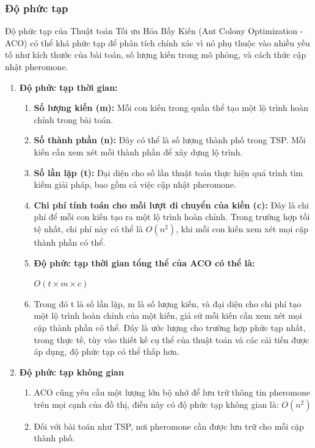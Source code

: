\documentclass[14pt]{article}
\begin{document}
	\subsubsection{Độ phức tạp}
	Độ phức tạp của Thuật toán Tối ưu Hóa Bầy Kiến (Ant Colony Optimization - ACO) có thể khá phức tạp để phân tích chính xác vì nó phụ thuộc vào nhiều yếu tố như kích thước của bài toán, số lượng kiến trong mô phỏng, và cách thức cập nhật pheromone.
	\begin{enumerate}
		\item\textbf{Độ phức tạp thời gian:}
		\begin{enumerate}
			\item\textbf{Số lượng kiến (m):} Mỗi con kiến trong quần thể tạo một lộ trình hoàn chỉnh trong bài toán.
			
			\item\textbf{Số thành phần (n):} Đây có thể là số lượng thành phố trong TSP. Mỗi kiến cần xem xét mỗi thành phần để xây dựng lộ trình.
			
			\item\textbf{Số lần lặp (t):}  Đại diện cho số lần thuật toán thực hiện quá trình tìm kiếm giải pháp, bao gồm cả việc cập nhật pheromone.
			
			\item\textbf{Chi phí tính toán cho mỗi lượt di chuyển của kiến (c):} Đây là chi phí để mỗi con kiến tạo ra một lộ trình hoàn chỉnh. Trong trường hợp tồi tệ nhất, chi phí này có thể là \(O(n^{2})\), khi mỗi con kiến xem xét mọi cặp thành phần có thể.

			 \item\textbf{Độ phức tạp thời gian tổng thể của ACO có thể là:} 
			\begin{center}
				\(O(t \times m \times c)\)
			\end{center}
			
			
			\item Trong đó t là số lần lặp, m là số lượng kiến, và  đại diện cho chi phí tạo một lộ trình hoàn chỉnh của một kiến, giả sử mỗi kiến cần xem xét mọi cặp thành phần có thể. Đây là ước lượng cho trường hợp phức tạp nhất, trong thực tế, tùy vào thiết kế cụ thể của thuật toán và các cải tiến được áp dụng, độ phức tạp có thể thấp hơn.
		\end{enumerate}
	
		\item\textbf{Độ phức tạp không gian}
		\begin{enumerate}
			\item ACO cũng yêu cầu một lượng lớn bộ nhớ để lưu trữ thông tin pheromone trên mọi cạnh của đồ thị, điều này có độ phức tạp không gian là: \(O(n^{2})\)
			
			\item Đối với bài toán như TSP, nơi pheromone cần được lưu trữ cho mỗi cặp thành phố.
			
		\end{enumerate}
		
	\end{enumerate}
\end{document}
